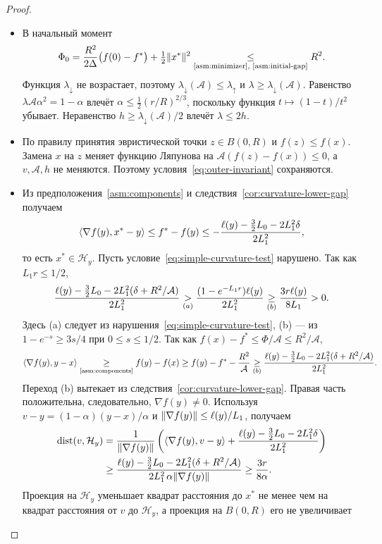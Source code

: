 \begin{proof}
\leavevmode
\begin{itemize}
\item В начальный момент
\[
 \Phi_0=\frac{R^2}{2\Delta}\bigl(f(0)-f^\ast\bigr)
          +\tfrac12\norm{x^\ast}^2
 \by{\le}{\text{\ref{asm:minimizer}, \ref{asm:initial-gap}}}R^2.
\]
Функция $\lambda_\downarrow$ не возрастает, поэтому
$\lambda_\downarrow(\mathcal A)\le\lambda_{\uparrow}$ и
$\lambda\ge\lambda_\downarrow(\mathcal A)$.
Равенство $\lambda\mathcal A\alpha^2=1-\alpha$ влечёт
$\alpha\le\frac12(r/R)^{2/3}$, поскольку функция $t\mapsto(1-t)/t^2$
убывает. Неравенство $h\ge\lambda_\downarrow(\mathcal A)/2$ влечёт
$\lambda\le2h$.
\item По правилу принятия эвристической точки
$z\in B(0,R)$ и $f(z)\le f(x)$. Замена $x$ на $z$ меняет функцию Ляпунова на
$\mathcal A(f(z)-f(x))\le0$, а $v,\mathcal A,h$ не меняются.
Поэтому условия~\eqref{eq:outer-invariant} сохраняются.
\item Из предположения~\ref{asm:components}
и следствия~\ref{cor:curvature-lower-gap} получаем
\[
 \ip{\nabla f(y)}{x^\ast-y}\le f^\ast-f(y)
 \le-\frac{\ell(y)-\frac32L_0-2L_1^2\delta}{2L_1^2},
\]
то есть $x^\ast\in\mathcal H_y$. Пусть условие~\eqref{eq:simple-curvature-test}
нарушено. Так как $L_1r\le1/2$,
\[
 \frac{\ell(y)-\frac32L_0-2L_1^2(\delta+R^2/\mathcal A)}{2L_1^2}
 \by{>}{(a)}\frac{(1-e^{-L_1r})\ell(y)}{2L_1^2}
 \by{\ge}{(b)}\frac{3r\ell(y)}{8L_1}>0.
\]
Здесь (a) следует из нарушения~\eqref{eq:simple-curvature-test},
(b) --- из $1-e^{-s}\ge3s/4$ при $0\le s\le1/2$.
Так как $f(x)-f^\ast\le\Phi/\mathcal A\le R^2/\mathcal A$,
\[
 \ip{\nabla f(y)}{y-x}\by{\ge}{\text{\ref{asm:components}}}f(y)-f(x)
 \ge f(y)-f^\ast-\frac{R^2}{\mathcal A}
 \by{\ge}{(b)}\frac{\ell(y)-\frac32L_0-2L_1^2(\delta+R^2/\mathcal A)}{2L_1^2}.
\]
Переход (b) вытекает из следствия~\ref{cor:curvature-lower-gap}.
Правая часть положительна, следовательно, $\nabla f(y)\ne0$. Используя
$v-y=(1-\alpha)(y-x)/\alpha$ и $\norm{\nabla f(y)}\le\ell(y)/L_1$,
получаем
\begin{align*}
 \dist(v,\mathcal H_y)&=\frac1{\norm{\nabla f(y)}}\left(\ip{\nabla f(y)}{v-y}
   +\frac{\ell(y)-\frac32L_0-2L_1^2\delta}{2L_1^2}\right)
 \\&\ge\frac{\ell(y)-\frac32L_0-2L_1^2(\delta+R^2/\mathcal A)}
          {2L_1^2\,\alpha\norm{\nabla f(y)}}
 \ge\frac{3r}{8\alpha}.
\end{align*}
Проекция на $\mathcal H_y$ уменьшает квадрат расстояния до $x^\ast$
не менее чем на квадрат расстояния от $v$ до $\mathcal H_y$, а проекция на $B(0,R)$ его не увеличивает

\end{itemize}
\end{proof}
